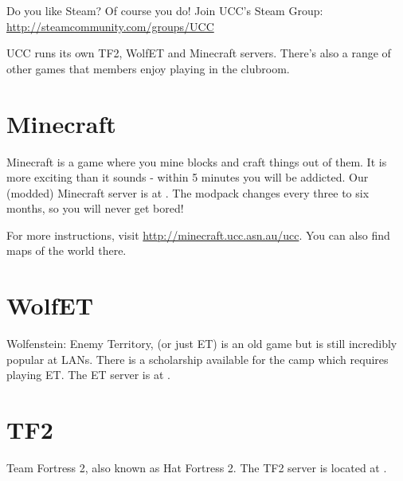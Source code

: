 \label{Games}

Do you like Steam? Of course you do! Join UCC's Steam Group: \url{http://steamcommunity.com/groups/UCC}

\noindent UCC runs its own TF2, WolfET and Minecraft servers.
There's also a range of other games that members enjoy playing in the clubroom.

\section{Minecraft}
Minecraft is a game where you mine blocks and craft things out of them. It is more exciting than it sounds - within 5 minutes you will be addicted.
Our (modded) Minecraft server is at . The modpack changes every three to six months, so you will never get bored!

For more instructions, visit \url{http://minecraft.ucc.asn.au/ucc}. You can also find maps of the world there. %

\section{WolfET}
Wolfenstein: Enemy Territory, (or just ET) is an old game but is still incredibly popular at LANs. There is a scholarship  available for the camp which requires playing ET. The ET server is at .

\section{TF2}
Team Fortress 2, also known as Hat Fortress 2. The TF2 server is located at .

